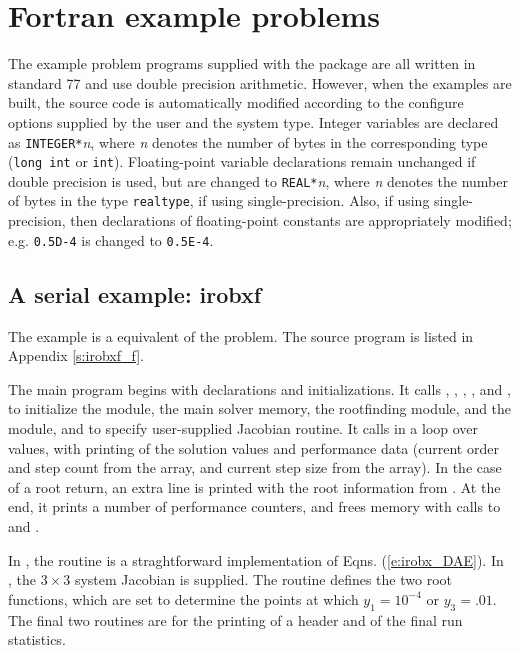 \section{Fortran example problems}\label{s:ex_fortran}

The {\F} example problem programs supplied with the {\ida}
package are all written in standard {\F}77 and use double precision
arithmetic. However, when the {\F} examples are built, the source code is
automatically modified according to the configure options supplied by the
user and the system type. Integer variables are declared as {\tt INTEGER*}{\em n},
where {\em n} denotes the number of bytes in the corresponding {\C} type
({\tt long int} or {\tt int}). Floating-point variable declarations remain
unchanged if double precision is used, but are changed to {\tt REAL*}{\em n},
where {\em n} denotes the number of bytes in the {\sundials} type {\tt realtype},
if using single-precision. Also, if using single-precision, then declarations of
floating-point constants are appropriately modified; e.g. {\tt 0.5D-4} is
changed to {\tt 0.5E-4}.


\subsection{A serial example: irobxf}\label{ss:irobxf}

The  example is a {\F} equivalent of the  problem.
The source program  is listed in Appendix \ref{s:irobxf_f}.

The main program begins with declarations and initializations.  It calls 
, , , , and
, to initialize the {\nvecs} module, the main
solver memory, the rootfinding module, and the {\idadense} module, and
to specify user-supplied Jacobian routine.
It calls  in a loop over  values, with printing of
the solution values and performance data (current order and step count
from the  array, and current step size from the  array).
In the case of a root return, an extra line is printed with the root
information from .  At the end, it prints a number of
performance counters, and frees memory with calls to 
and .

In , the  routine is a straghtforward
implementation of Eqns. (\ref{e:irobx_DAE}).  In , the 
$3 \times 3$ system Jacobian is supplied.  The  routine
defines the two root functions, which are set to determine the points at which
$y_1 = 10^{-4}$ or $y_3 = .01$.  The final two routines are for the
printing of a header and of the final run statistics.

